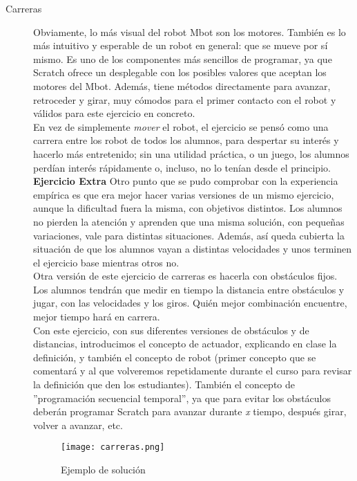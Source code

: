 \begin{description}

\item [Carreras]\label{ej:carreras}
Obviamente, lo más visual del robot Mbot son los motores. También es lo más intuitivo y esperable de un robot en general: que se mueve por sí mismo. Es uno de los componentes más sencillos de programar, ya que Scratch ofrece un desplegable con los posibles valores que aceptan los motores del Mbot. Además, tiene métodos directamente para avanzar, retroceder y girar, muy cómodos para el primer contacto con el robot y válidos para este ejercicio en concreto. \\
En vez de simplemente \textit{mover} el robot, el ejercicio se pensó como una carrera entre los robot de todos los alumnos, para despertar su interés y hacerlo más entretenido; sin una utilidad práctica, o un juego, los alumnos perdían interés rápidamente o, incluso, no lo tenían desde el principio. \\
\textbf{Ejercicio Extra} Otro punto que se pudo comprobar con la experiencia empírica es que era mejor hacer varias versiones de un mismo ejercicio, aunque la dificultad fuera la misma, con objetivos distintos. Los alumnos no pierden la atención y aprenden que una misma solución, con pequeñas variaciones, vale para distintas situaciones. Además, así queda cubierta la situación de que los alumnos vayan a distintas velocidades y unos terminen el ejercicio base mientras otros no.\\
Otra versión de este ejercicio de carreras es hacerla con obstáculos fijos. Los alumnos tendrán que medir en tiempo la distancia entre obstáculos y jugar, con las velocidades y los giros. Quién mejor combinación encuentre, mejor tiempo hará en carrera.\\
Con este ejercicio, con sus diferentes versiones de obstáculos y de distancias, introducimos el concepto de actuador, explicando en clase la definición, y también el concepto de robot (primer concepto que se comentará y al que volveremos repetidamente durante el curso para revisar la definición que den los estudiantes). También el concepto de ''programación secuencial temporal'', ya que para evitar los obstáculos deberán programar Scratch para avanzar durante \textit{x} tiempo, después girar, volver a avanzar, etc.
\begin{figure}[h]
	\centering
	\texttt{[image: carreras.png]}
	\label{img:carreras}
	\caption{Ejemplo de solución}
\end{figure}
\begin{figure}[H]

\end{figure}
\end{description}
